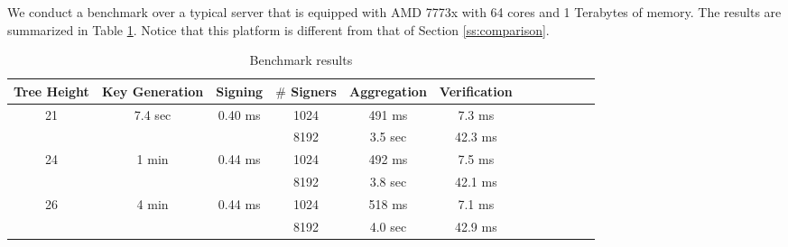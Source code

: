 We conduct a benchmark over a typical server that is equipped with AMD 7773x with
64 cores and 1 Terabytes of memory.
The results are summarized in Table \ref{tab:bench_results}.
Notice that this platform is different from that of Section \ref{ss:comparison}.

\begin{table}[t]\centering
  \begin{tabular}{|c|c|c|c|c|c|c|c|c||c|c|c|}\hline
      Tree Height         & Key Generation            & Signing                   & $\#$ Signers  &  Aggregation & Verification  \\ \hline\hline
      \multirow{2}{*}{21} & \multirow{2}{*}{7.4 sec}  & \multirow{2}{*}{0.40 ms}  & 1024    &   491 ms     &  7.3 ms       \\\cline{4-6}
                          &                           &                           & 8192    &   3.5 sec    &  42.3 ms      \\\hline\hline

      \multirow{2}{*}{24} & \multirow{2}{*}{1 min}    & \multirow{2}{*}{0.44 ms}  & 1024    &   492 ms     &  7.5 ms       \\\cline{4-6}
                          &                           &                           & 8192    &   3.8 sec    &  42.1 ms      \\\hline\hline

      \multirow{2}{*}{26} & \multirow{2}{*}{  4 min}  & \multirow{2}{*}{0.44 ms}  & 1024    &   518 ms     &  7.1 ms       \\\cline{4-6}
                          &                           &                           & 8192    &   4.0 sec    &  42.9 ms      \\\hline

  \end{tabular}\\
  \caption{Benchmark results}
  \label{tab:bench_results}
\end{table}

